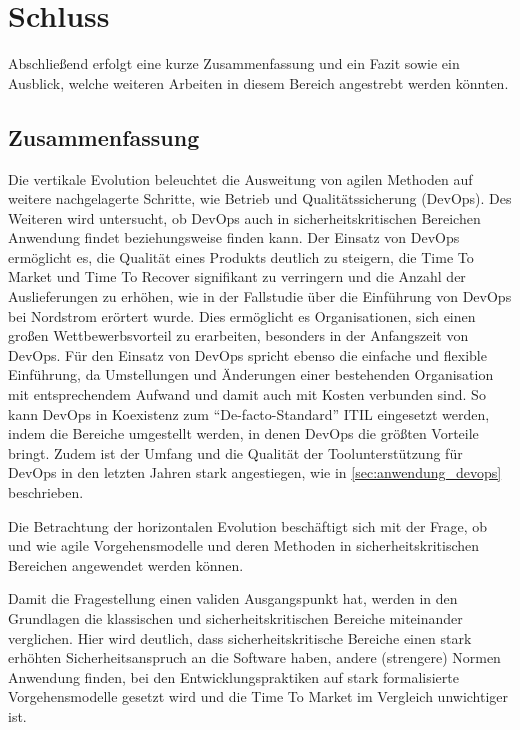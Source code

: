 \chapter{Schluss} %

Abschließend erfolgt eine kurze Zusammenfassung und ein Fazit sowie ein Ausblick, welche weiteren Arbeiten in diesem Bereich angestrebt werden könnten.

\section{Zusammenfassung}

Die vertikale Evolution beleuchtet die Ausweitung von agilen Methoden auf weitere nachgelagerte Schritte, wie Betrieb und Qualitätssicherung (DevOps).
Des Weiteren wird untersucht, ob DevOps auch in sicherheitskritischen Bereichen Anwendung findet beziehungsweise finden kann.
Der Einsatz von DevOps ermöglicht es, die Qualität eines Produkts deutlich zu steigern, die Time To Market und Time To Recover signifikant zu verringern und die Anzahl der Auslieferungen zu erhöhen, wie in der Fallstudie über die Einführung von DevOps bei Nordstrom erörtert wurde. 
Dies ermöglicht es Organisationen, sich einen großen Wettbewerbsvorteil zu erarbeiten, besonders in der Anfangszeit von DevOps. 
Für den Einsatz von DevOps spricht ebenso die einfache und flexible Einführung, da Umstellungen und Änderungen einer bestehenden Organisation mit entsprechendem Aufwand und damit auch mit Kosten verbunden sind. 
So kann DevOps in Koexistenz zum \enquote{De-facto-Standard} ITIL eingesetzt werden, indem die Bereiche umgestellt werden, in denen DevOps die größten Vorteile bringt. 
Zudem ist der Umfang und die Qualität der Toolunterstützung für DevOps in den letzten Jahren stark angestiegen, wie in \autoref{sec:anwendung_devops} beschrieben.

Die Betrachtung der horizontalen Evolution beschäftigt sich mit der Frage, ob und wie agile Vorgehensmodelle und deren Methoden in sicherheitskritischen Bereichen angewendet werden können.

Damit die Fragestellung einen validen Ausgangspunkt hat, werden in den Grundlagen die klassischen und sicherheitskritischen Bereiche miteinander verglichen.
Hier wird deutlich, dass sicherheitskritische Bereiche einen stark erhöhten Sicherheitsanspruch an die Software haben, andere (strengere) Normen Anwendung finden, bei den Entwicklungspraktiken auf stark formalisierte Vorgehensmodelle gesetzt wird und die Time To Market im Vergleich unwichtiger ist.


